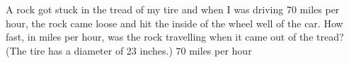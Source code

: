 {A rock got stuck in the tread of my tire and when I was driving 70 miles per hour, the rock came loose and hit the inside of the wheel well of the car.  How fast, in miles per hour, was the rock travelling when it came out of the tread?  (The tire has a diameter of 23 inches.)}
{70 miles per hour}
